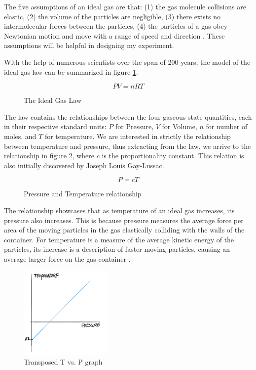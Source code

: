 \documentclass[a4paper,12pt]{article}
\begin{document}
The five assumptions of an ideal gas are that: (1) the gas molecule collisions are elastic, (2) the volume of the particles are negligible, (3) there exists no intermolecular forces between the particles, (4) the particles of a gas obey Newtonian motion and move with a range of speed and direction \parencite{gas_law}. These assumptions will be helpful in designing my experiment.

With the help of numerous scientists over the span of 200 years, the model of the ideal gas law can be summarized in figure \ref{fig:igl}.

\begin{figure}[H]
    \[
    PV = nRT
    \]
    \caption{The Ideal Gas Law}
    \label{fig:igl}
\end{figure}

The law contains the relationships between the four gaseous state quantities, each in their respective standard units: $P$ for Pressure, $V$ for Volume, $n$ for number of moles, and $T$ for temperature. We are interested in strictly the relationship between temperature and pressure, thus extracting from the law, we arrive to the relationship in figure \ref{fig:pt}, where $c$ is the proportionality constant. This relation is also initially discovered by Joseph Louis Gay-Lussac.

\begin{figure}[H]
    \[
    P = cT
    \]
    \caption{Pressure and Temperature relationship}
    \label{fig:pt}
\end{figure}

The relationship showcases that as temperature of an ideal gas increases, its pressure also increases. This is because pressure measures the average force per area of the moving particles in the gas elastically colliding with the walls of the container. For temperature is a measure of the average kinetic energy of the particles, its increase is a description of faster moving particles, causing an average larger force on the gas container \parencite{pearson}.



\begin{figure}
    \centering
    \includegraphics[width=0.4\textwidth]{assets/az.png}
    \caption{Transposed T vs. P graph}
    \label{fig:az}
\end{figure}
\end{document}
